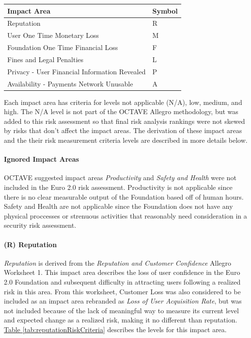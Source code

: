 \documentclass[a4paper,12pt]{article} %
\newcommand{\hypertableref}[1]{\hyperref[#1]{Table \ref{#1}}}
\begin{document}
{\begin{center}
\begin{tabular}{ | l | l |}
  \hline
  \textbf{Impact Area} & \textbf{Symbol}
  \\ \hline
  Reputation & R
  \\ \hline
  User One Time Monetary Loss & M
  \\ \hline
  Foundation One Time Financial Loss & F
  \\ \hline
  Fines and Legal Penalties & L
  \\ \hline
  Privacy - User Financial Information Revealed & P
  \\ \hline
  Availability - Payments Network Unusable & A
  \\ \hline
\end{tabular}
\end{center}
\label{tab:riskImpactAreas}

Each impact area has criteria for levels not applicable (N/A), low, medium, and high. The N/A level is not part of the OCTAVE Allegro methodology, but was added to this risk assessment so that final risk analysis rankings were not skewed by risks that don't affect the impact areas. The derivation of these impact areas and the their risk measurement criteria levels are described in more details below.

\paragraph{Ignored Impact Areas}

OCTAVE suggested impact areas \textit{Productivity} and \textit{Safety and Health} were not included in the Euro 2.0 risk assessment. Productivity is not applicable since there is no clear measurable output of the Foundation based off of human hours. Safety and Health are not applicable since the Foundation does not have any physical proccesses or strenuous activities that reasonably need consideration in a security risk assessment.

\paragraph{(R) Reputation}

\textit{Reputation} is derived from the \textit{Reputation and Customer Confidence} Allegro Worksheet 1. This impact area describes the loss of user confidence in the Euro 2.0 Foundation and subsequent difficulty in attracting users following a realized risk in this area. From this worksheet, Customer Loss was also considered to be included as an impact area rebranded as \textit{Loss of User Acquisition Rate}, but was not included because of the lack of meaningful way to measure its current level and expected change as a realized risk, making it no different than reputation. \hypertableref{tab:reputationRiskCriteria} describes the levels for this impact area.

}
\end{document}
